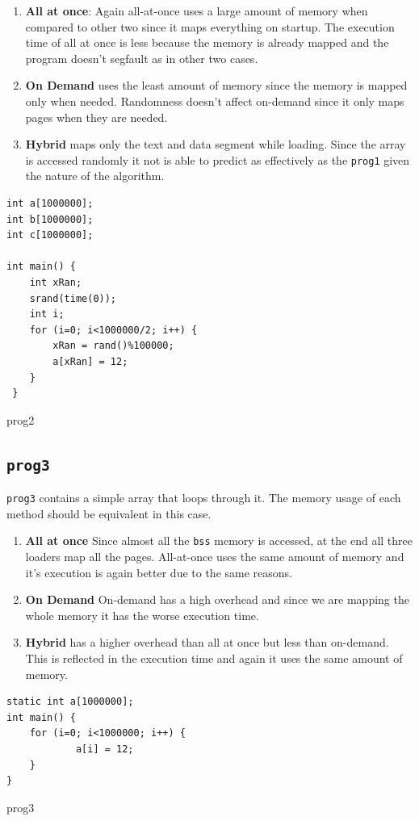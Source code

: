 \documentclass[10pt] {article}
\begin{document}
\begin{enumerate}
\item \textbf{All at once}: Again all-at-once uses a large amount of memory when compared to other two since it maps everything on startup. The execution time of all at once is less because the memory is already mapped and the program doesn't segfault as in other two cases.
\item \textbf{On Demand} uses the least amount of memory since the memory is mapped only when needed. Randomness doesn't affect on-demand since it only maps pages when they are needed.
\item \textbf{Hybrid} maps only the text and data segment while loading. Since the array is accessed randomly it not is able to predict as effectively as the \texttt{prog1} given the nature of the algorithm. 
\end{enumerate}


\begin{listing}[ht!]
\begin{verbatim}
int a[1000000];
int b[1000000];
int c[1000000];

int main() {
	int xRan;
	srand(time(0));
	int i;
	for (i=0; i<1000000/2; i++) {
		xRan = rand()%100000;
		a[xRan] = 12;
	}
 }
\end{verbatim}
\label{lst:sched}
\caption{prog2}
\end{listing}

\subsection{\texttt{prog3}}  
\texttt{prog3} contains a simple array that loops through it. The memory usage of each method should be equivalent in this case.
\begin{enumerate}
\item \textbf{All at once} Since almost all the \texttt{bss} memory is accessed, at the end all three loaders map all the pages. All-at-once uses the same amount of memory and it's execution is again better due to the same reasons. 
\item \textbf{On Demand} On-demand has a high overhead and since we are mapping the whole memory it has the worse execution time.
\item \textbf{Hybrid} has a higher overhead than all at once but less than on-demand. This is reflected in the execution time and again it uses the same amount of memory.
\end{enumerate}

\begin{listing}[ht!]
\begin{verbatim}
static int a[1000000];
int main() {
	for (i=0; i<1000000; i++) {
    		a[i] = 12;
  	}
}
\end{verbatim}
\label{lst:sched}
\caption{prog3}
\end{listing}
\end{document}
